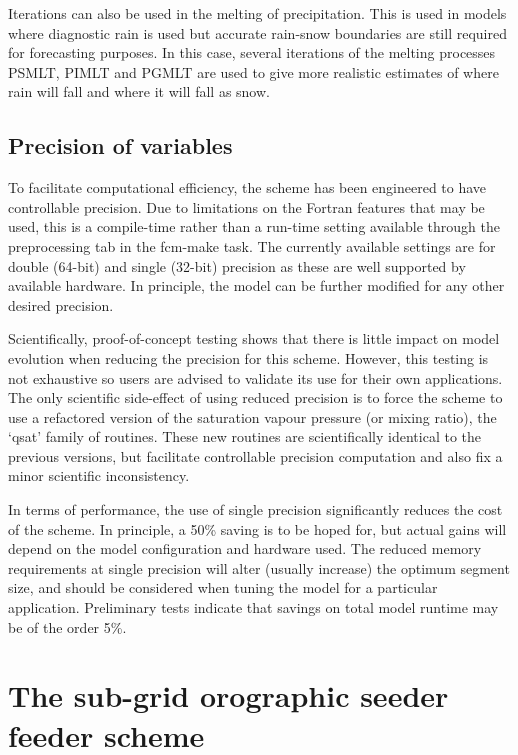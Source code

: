 \documentclass{UMDP_article}
\begin{document}
Iterations can also be used in the melting of precipitation. This is 
used in models where diagnostic rain is used but accurate rain-snow boundaries are still required for forecasting purposes. In this case, several iterations of the melting processes PSMLT, PIMLT and PGMLT are used to give more realistic estimates of where rain will fall and where it will fall as snow.

\subsection{Precision of variables}

To facilitate computational efficiency, the scheme has been engineered to have controllable precision. Due to limitations on the Fortran features that may be used, this is a compile-time rather than a run-time setting available through the preprocessing tab in the fcm-make task. The currently available settings are for double (64-bit) and single (32-bit) precision as these are well supported by available hardware. In principle, the model can be further modified for any other desired precision.

Scientifically, proof-of-concept testing shows that there is little impact on model evolution when reducing the precision for this scheme. However, this testing is not exhaustive so users are advised to validate its use for their own applications. The only scientific side-effect of using reduced precision is to force the scheme to use a refactored version of the saturation vapour pressure (or mixing ratio), the `qsat' family of routines. These new routines are scientifically identical to the previous versions, but facilitate controllable precision computation and also fix a minor scientific inconsistency.

In terms of performance, the use of single precision significantly reduces the cost of the scheme. In principle, a 50\% saving is to be hoped for, but actual gains will depend on the model configuration and hardware used. The reduced memory requirements at single precision will alter (usually increase) the optimum segment size, and should be considered when tuning the model for a particular application. Preliminary tests indicate that savings on total model runtime may be of the order 5\%.

\newpage
\section{The sub-grid orographic seeder feeder scheme}
\label{sec:seeder_feeder}
\end{document}
